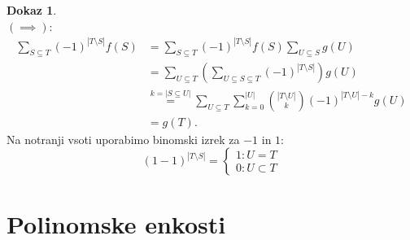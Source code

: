 \documentclass[a4paper, 12pt]{book}
\theoremstyle{definition}
\newtheorem{pro}[counter]{Dokaz}
\theoremstyle{remark}
\begin{document}
\begin{pro} \text{} \\
  $(\implies)$:
  \begin{align*}
    \sum_{S \subseteq T} (-1)^{|T \setminus S|} f(S) &= \sum_{S \subseteq T} (-1)^{|T \setminus S|} f(S) \sum_{U \subseteq S} g(U) \\
    &= \sum_{U \subseteq T} \left(\sum_{U \subseteq S \subseteq T} (-1)^{|T \setminus S|}\right) g(U) \\
    &\stackrel{k=|S \subseteq U|}{=} \sum_{U \subseteq T}
      \sum_{k=0}^{|U|} \binom{|T \setminus U|}{k} (-1)^{|T \setminus U| - k} g(U) \\
    &= g(T).
  \end{align*}
  Na notranji vsoti uporabimo binomski izrek za $-1$ in $1:$
  \begin{equation*}
    (1-1)^{|T \setminus S|} =
    \begin{cases}
      1: U = T \\
      0: U \subset T
    \end{cases}
  \end{equation*}
\end{pro}


\section{Polinomske enkosti}
\end{document}
